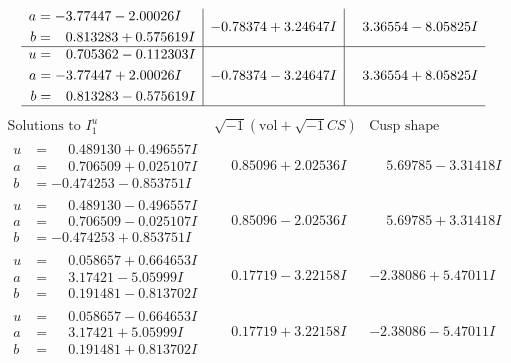 \documentclass[1p]{elsarticle_modified}
\theoremstyle{definition}
\newcommand{\I}{\sqrt{-1}}
\begin{document}
$$\begin{array}{c|c|c}
\begin{aligned}
a &= -3.77447 - 2.00026 I \\
b &= \phantom{-}0.813283 + 0.575619 I\end{aligned}
 & -0.78374 + 3.24647 I & \phantom{-}3.36554 - 8.05825 I \\ \hline\begin{aligned}
u &= \phantom{-}0.705362 - 0.112303 I \\
a &= -3.77447 + 2.00026 I \\
b &= \phantom{-}0.813283 - 0.575619 I\end{aligned}
 & -0.78374 - 3.24647 I & \phantom{-}3.36554 + 8.05825 I\\
 \hline 
 \end{array}$$\newpage$$\begin{array}{c|c|c}  
\text{Solutions to }I^u_{1}& \I (\text{vol} + \sqrt{-1}CS) & \text{Cusp shape}\\
 \hline 
\begin{aligned}
u &= \phantom{-}0.489130 + 0.496557 I \\
a &= \phantom{-}0.706509 + 0.025107 I \\
b &= -0.474253 - 0.853751 I\end{aligned}
 & \phantom{-}0.85096 + 2.02536 I & \phantom{-}5.69785 - 3.31418 I \\ \hline\begin{aligned}
u &= \phantom{-}0.489130 - 0.496557 I \\
a &= \phantom{-}0.706509 - 0.025107 I \\
b &= -0.474253 + 0.853751 I\end{aligned}
 & \phantom{-}0.85096 - 2.02536 I & \phantom{-}5.69785 + 3.31418 I \\ \hline\begin{aligned}
u &= \phantom{-}0.058657 + 0.664653 I \\
a &= \phantom{-}3.17421 - 5.05999 I \\
b &= \phantom{-}0.191481 - 0.813702 I\end{aligned}
 & \phantom{-}0.17719 - 3.22158 I & -2.38086 + 5.47011 I \\ \hline\begin{aligned}
u &= \phantom{-}0.058657 - 0.664653 I \\
a &= \phantom{-}3.17421 + 5.05999 I \\
b &= \phantom{-}0.191481 + 0.813702 I\end{aligned}
 & \phantom{-}0.17719 + 3.22158 I & -2.38086 - 5.47011 I \\ \hline\begin{aligned}

\end{aligned}
\end{array}$$
\end{document}
